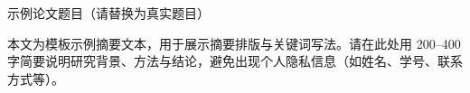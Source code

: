 \begin{zhabstract}{示例论文题目（请替换为真实题目）}

本文为模板示例摘要文本，用于展示摘要排版与关键词写法。请在此处用 200–400 字简要说明研究背景、方法与结论，避免出现个人隐私信息（如姓名、学号、联系方式等）。

\end{zhabstract}

